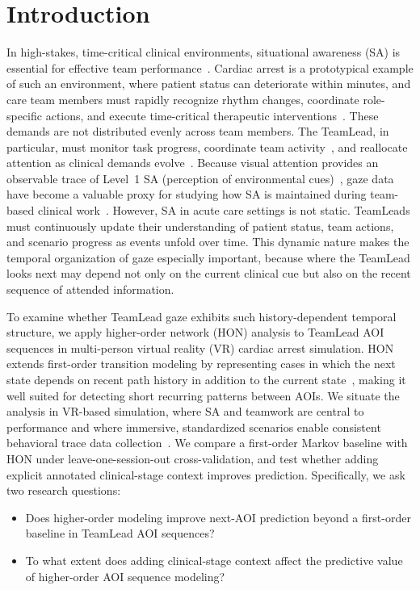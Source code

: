 \documentclass[runningheads]{llncs}
\begin{document}
\section{Introduction}

In high-stakes, time-critical clinical environments, situational awareness (SA) is essential for effective team performance~\cite{popov2025communication}. Cardiac arrest is a prototypical example of such an environment, where patient status can deteriorate within minutes, and care team members must rapidly recognize rhythm changes, coordinate role-specific actions, and execute time-critical therapeutic interventions~\cite{nallamothu2018resuscitation}. These demands are not distributed evenly across team members. The TeamLead, in particular, must monitor task progress, coordinate team activity~\cite{kolbe2013co}, and reallocate attention as clinical demands evolve~\cite{gao2026towards}. Because visual attention provides an observable trace of Level~1 SA (perception of environmental cues)~\cite{ensley1995toward}, gaze data have become a valuable proxy for studying how SA is maintained during team-based clinical work~\cite{caloca2024exploring,weinberg2020visual}. However, SA in acute care settings is not static. TeamLeads must continuously update their understanding of patient status, team actions, and scenario progress as events unfold over time. This dynamic nature makes the temporal organization of gaze especially important, because where the TeamLead looks next may depend not only on the current clinical cue but also on the recent sequence of attended information.

To examine whether TeamLead gaze exhibits such history-dependent temporal structure, we apply higher-order network (HON) analysis to TeamLead AOI sequences in multi-person virtual reality (VR) cardiac arrest simulation. HON extends first-order transition modeling by representing cases in which the next state depends on recent path history in addition to the current state~\cite{xuRepresentingHigherorderDependencies2016}, making it well suited for detecting short recurring patterns between AOIs. We situate the analysis in VR-based simulation, where SA and teamwork are central to performance and where immersive, standardized scenarios enable consistent behavioral trace data collection~\cite{rosen2015integrative}. We compare a first-order Markov baseline with HON under leave-one-session-out cross-validation, and test whether adding explicit annotated clinical-stage context improves prediction. Specifically, we ask two research questions:
\begin{itemize}
  \item[\textbf{RQ1.}] Does higher-order modeling improve next-AOI prediction beyond a first-order baseline in TeamLead AOI sequences?
  \item[\textbf{RQ2.}] To what extent does adding clinical-stage context affect the predictive value of higher-order AOI sequence modeling?
\end{itemize}
\end{document}
